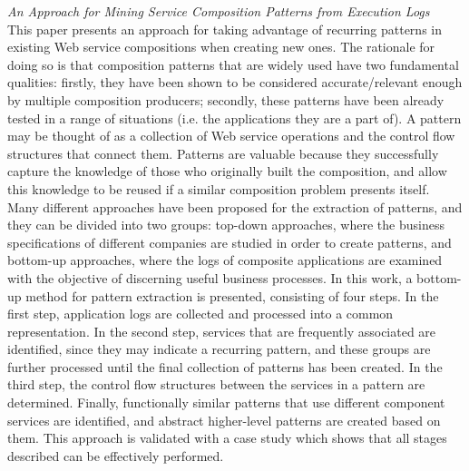 \textit{An Approach for Mining Service Composition Patterns from Execution Logs \cite{upadhyaya2013approach}}\\
This paper presents an approach for taking advantage of recurring patterns in existing Web service compositions when
creating new ones. The rationale for doing so is that composition patterns that are widely used have two fundamental
qualities: firstly, they have been shown to be considered accurate/relevant enough by multiple composition producers;
secondly, these patterns have been already tested in a range of situations (i.e. the applications they are a part of).
A pattern may be thought of as a collection of Web service operations and the control flow structures that connect them.
Patterns are valuable because they successfully capture the knowledge of those who originally built the composition,
and allow this knowledge to be reused if a similar composition problem presents itself. Many different approaches have
been proposed for the extraction of patterns, and they can be divided into two groups: top-down approaches, where the
business specifications of different companies are studied in order to create patterns, and bottom-up approaches, where
the logs of composite applications are examined with the objective of discerning useful business processes. In this work,
a bottom-up method for pattern extraction is presented, consisting of four steps. In the first step, application logs are
collected and processed into a common representation. In the second step, services that are frequently associated are
identified, since they may indicate a recurring pattern, and these groups are further processed until the final collection
of patterns has been created. In the third step, the control flow structures between the services in a pattern are determined.
Finally, functionally similar patterns that use different component services are identified, and abstract higher-level
patterns are created based on them. This approach is validated with a case study which shows that all stages described
can be effectively performed.
